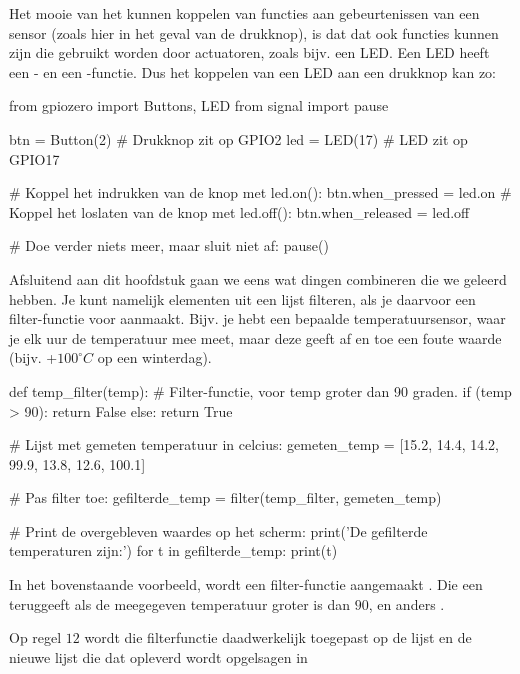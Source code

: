 \begin{remark}
Het mooie van het kunnen koppelen van functies aan gebeurtenissen van een sensor (zoals hier in het geval van de drukknop), is dat dat ook functies kunnen zijn die gebruikt worden door actuatoren, zoals bijv. een LED. Een LED heeft een - en een -functie. Dus het koppelen van een LED aan een drukknop kan zo:

\begin{python}
from gpiozero import Buttons, LED
from signal import pause

btn = Button(2)  # Drukknop zit op GPIO2
led = LED(17)    # LED zit op GPIO17

# Koppel het indrukken van de knop met led.on():
btn.when_pressed = led.on    
# Koppel het loslaten van de knop met led.off():
btn.when_released = led.off  

# Doe verder niets meer, maar sluit niet af:
pause()                      
\end{python}
\end{remark}

\newpage
Afsluitend aan dit hoofdstuk gaan we eens wat dingen combineren die we geleerd hebben. Je kunt namelijk elementen uit een lijst filteren, als je daarvoor een filter-functie voor aanmaakt. Bijv. je hebt een bepaalde temperatuursensor, waar je elk uur de temperatuur mee meet, maar deze geeft af en toe een foute waarde (bijv. +$100^\circ C$ op een winterdag). 

\begin{python}
def temp_filter(temp):
    # Filter-functie, voor temp groter dan 90 graden.
    if (temp > 90):
        return False
    else:
        return True

# Lijst met gemeten temperatuur in celcius:  
gemeten_temp = [15.2, 14.4, 14.2, 99.9, 13.8, 12.6, 100.1]

# Pas filter toe:
gefilterde_temp = filter(temp_filter, gemeten_temp)

# Print de overgebleven waardes op het scherm:
print('De gefilterde temperaturen zijn:')
for t in gefilterde_temp:
    print(t)                    
\end{python}

In het bovenstaande voorbeeld, wordt een filter-functie aangemaakt . Die een  teruggeeft als de meegegeven temperatuur  groter is dan $90$, en anders . \newline

Op regel $12$ wordt die filterfunctie daadwerkelijk toegepast op de lijst  en de nieuwe lijst die dat opleverd wordt opgelsagen in 

